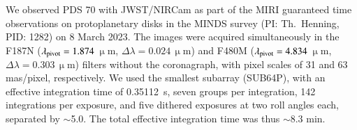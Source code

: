 \documentclass[longauth]{aa}
\begin{document}
    We observed PDS 70 with JWST/NIRCam \citep{Rieke2005} as part of the MIRI guaranteed time observations on protoplanetary disks in the MINDS survey (PI: Th.~Henning, PID: 1282) %
    on 8 March 2023. The images were acquired simultaneously in the F187N ($\lambda_{\rm pivot}=1.874$\,$\upmu$m, $\Delta \lambda=0.024$\,$\upmu$m) 
    and F480M ($\lambda_{\rm pivot}=4.834$\,$\upmu$m, $\Delta \lambda=0.303$\,$\upmu$m) 
    filters without the coronagraph, with pixel scales of 31 and 63 mas/pixel, respectively. %
    We used the smallest subarray (SUB64P), with an effective integration time of 0.35112~s, seven groups per integration, 142 integrations per exposure, and five dithered exposures at two
    roll angles each, separated by $\sim$5.0\degr. The total effective integration time was thus $\sim$8.3 min. %
    
\end{document}
